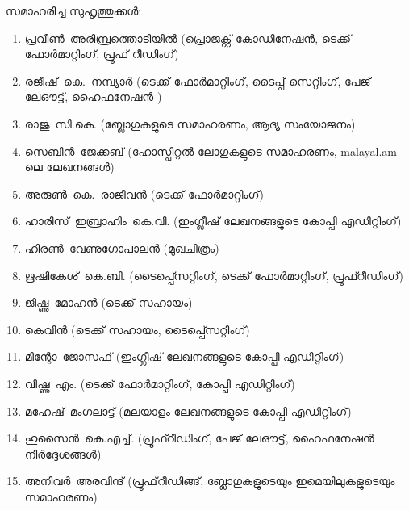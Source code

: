 ﻿
സമാഹരിച്ച സുഹൃത്തുക്കള്‍:

\begin{enumerate}
 \itemsep0em
 \item \mbox{പ്രവീണ്‍ അരിമ്പ്രത്തൊടിയില്‍} (പ്രൊജക്റ്റ് കോഡിനേഷന്‍, ടെക്ക് ഫോര്‍മാറ്റിംഗ്, പ്രൂഫ് റീഡിംഗ്)
 \item \mbox{രജീഷ് കെ. നമ്പ്യാര്‍} (ടെക്ക് ഫോര്‍മാറ്റിംഗ്, ടൈപ്പ് സെറ്റിംഗ്, പേജ് ലേഔട്ട്, ഹൈഫനേഷന്‍ )
 \item \mbox{രാജു സി.കെ.} (ബ്ലോഗുകളുടെ സമാഹരണം, ആദ്യ സംയോജനം)
 \item \mbox{സെബിന്‍ ജേക്കബ്} (ഹോസ്പിറ്റല്‍ ലോഗുകളുടെ സമാഹരണം, \url{malayal.am} ലെ ലേഖനങ്ങള്‍)
 \item \mbox{അരുണ്‍ കെ. രാജീവന്‍} (ടെക്ക് ഫോര്‍മാറ്റിംഗ്)
 \item \mbox{ഹാരിസ് ഇബ്രാഹിം  കെ.വി.} (ഇംഗ്ലീഷ് ലേഖനങ്ങളുടെ കോപ്പി എഡിറ്റിംഗ്)
 \item \mbox{ഹിരണ്‍ വേണുഗോപാലന്‍} (മുഖചിത്രം)
 \item \mbox{ഋഷികേശ് കെ.ബി.} (ടൈപ്പ്സെറ്റിംഗ്, ടെക്ക് ഫോര്‍മാറ്റിംഗ്, പ്രൂഫ്റീഡിംഗ്)
 \item \mbox{ജിഷ്ണു മോഹന്‍} (ടെക്ക് സഹായം)  
 \item \mbox{കെവിന്‍} (ടെക്ക് സഹായം, ടൈപ്പ്സെറ്റിംഗ്)
 \item \mbox{മിന്റോ ജോസഫ്} (ഇംഗ്ലീഷ് ലേഖനങ്ങളുടെ കോപ്പി എഡിറ്റിംഗ്)
 \item \mbox{വിഷ്ണു എം.} (ടെക്ക് ഫോര്‍മാറ്റിംഗ്, കോപ്പി എഡിറ്റിംഗ്)
 \item \mbox{മഹേഷ് മംഗലാട്ട്} (മലയാളം ലേഖനങ്ങളുടെ കോപ്പി എഡിറ്റിംഗ്)
 \item \mbox{ഹുസൈന്‍ കെ.എച്ച്.} (പ്രൂഫ്റീഡിംഗ്, പേജ് ലേഔട്ട്, ഹൈഫനേഷന്‍ നിര്‍ദ്ദേശങ്ങള്‍)
 \item \mbox{അനിവര്‍ അരവിന്ദ്} (പ്രൂഫ്‌റീഡിങ്ങ്, ബ്ലോഗുകളുടെയും  ഇമെയിലുകളുടെയും സമാഹരണം)
\end{enumerate}

\newpage

